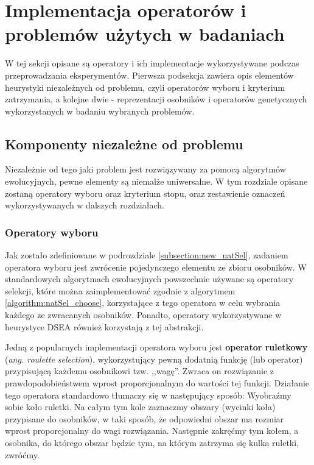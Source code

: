 \documentclass[./FM_mgr.tex]{subfiles}
\begin{document}
	\section{Implementacja operatorów i problemów użytych w badaniach} \label{appendix:impl_det}
	
	
	W tej sekcji opisane są operatory i ich implementacje wykorzystywane podczas przeprowadzania eksperymentów. 
	Pierwsza podsekcja zawiera opis elementów heurystyki niezależnych od problemu, czyli operatorów wyboru i kryterium zatrzymania, a kolejne dwie - reprezentacji osobników i operatorów genetycznych wykorzystanych w badaniu wybranych problemów.
	
	\subsection{Komponenty niezależne od problemu} \label{subsection:independent_impl}
	
	Niezależnie od tego jaki problem jest rozwiązywany za pomocą algorytmów ewolucyjnych, pewne elementy są niemalże uniwersalne. 
	W tym rozdziale opisane zostaną operatory wyboru oraz kryterium stopu, oraz zestawienie oznaczeń wykorzystywanych w dalszych rozdziałach.
	
	\subsubsection{Operatory wyboru}
	
	Jak zostało zdefiniowane w podrozdziale \ref{subsection:new_natSel}, zadaniem operatora wyboru jest zwrócenie pojedynczego elementu ze zbioru osobników.
	W standardowych algorytmach ewolucyjnych powszechnie używane są operatory selekcji, które można zaimplementować zgodnie z algorytmem \ref{algorithm:natSel_choose}, korzystające z tego operatora w celu wybrania każdego ze zwracanych osobników.
	Ponadto, operatory wykorzystywane w heurystyce DSEA również korzystają z tej abstrakcji.
	
	Jedną z popularnych implementacji operatora wyboru jest \textbf{operator ruletkowy} (\emph{ang. roulette selection}), wykorzystujący pewną dodatnią funkcję (lub operator) przypisującą każdemu osobnikowi tzw. ,,wagę''.
	Zwraca on rozwiązanie z prawdopodobieństwem wprost proporcjonalnym do wartości tej funkcji.
	Działanie tego operatora standardowo tłumaczy się w następujący sposób:
	Wyobraźmy sobie koło ruletki. 
	Na całym tym kole zaznaczmy obszary (wycinki koła) przypisane do osobników, w taki sposób, że odpowiedni obszar ma rozmiar wprost proporcjonalny do wagi rozwiązania. 
	Następnie zakręćmy tym kołem, a osobnika, do którego obszar będzie tym, na którym zatrzyma się kulka ruletki, zwróćmy.
	
\end{document}
